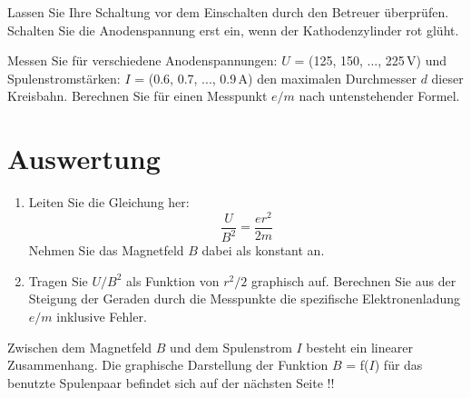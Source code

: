 \begin{hint}
Lassen Sie Ihre Schaltung vor dem Einschalten durch den Betreuer überprüfen. Schalten Sie die Anodenspannung erst ein, wenn der Kathodenzylinder rot glüht.
\end{hint}

\noindent
Messen Sie für verschiedene Anodenspannungen: $U$ = (125, 150, ..., 225\,V) und Spulenstromstärken: $I$ = (0.6, 0.7, ..., 0.9\,A) den maximalen Durchmesser $d$ dieser Kreisbahn. Berechnen Sie für einen Messpunkt $e/m$ nach untenstehender Formel.

\section{Auswertung} 
\begin{enumerate}
	\item Leiten Sie die Gleichung her:
		\begin{equation}
			\frac{U}{B^2} = \frac{er^2}{2m}
		\end{equation}
		Nehmen Sie das Magnetfeld $B$ dabei als konstant an.
	\item Tragen Sie $U/B^2$ als Funktion von $r^2/2$ graphisch auf. Berechnen Sie aus der Steigung der Geraden durch die Messpunkte die spezifische Elektronenladung $e/m$ inklusive Fehler.
\end{enumerate}

\begin{hint}
Zwischen dem Magnetfeld $B$ und dem Spulenstrom $I$ besteht ein linearer Zusammenhang. Die graphische Darstellung der Funktion $B$ = f($I$) für das benutzte Spulenpaar befindet sich auf der nächsten Seite !!
\end{hint}

